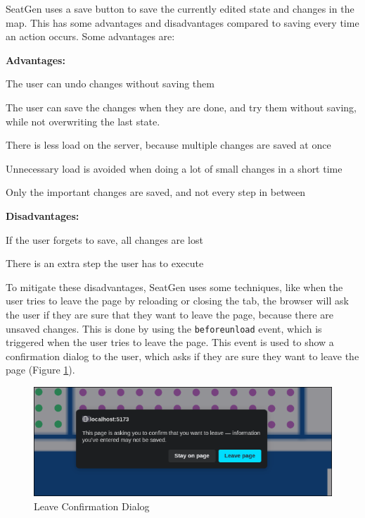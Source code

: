 SeatGen uses a save button to save the currently edited state and changes in the map. This has some advantages and disadvantages compared to saving every time an action occurs. Some advantages are:

\textbf{Advantages:}
\begin{compactitem}
    \item The user can undo changes without saving them
    \item The user can save the changes when they are done, and try them without saving, while not overwriting the last state.
    \item There is less load on the server, because multiple changes are saved at once
    \item Unnecessary load is avoided when doing a lot of small changes in a short time
    \item Only the important changes are saved, and not every step in between
\end{compactitem}

\textbf{Disadvantages:}
\begin{compactitem}
\item If the user forgets to save, all changes are lost
\item There is an extra step the user has to execute
\end{compactitem}

To mitigate these disadvantages, SeatGen uses some techniques, like when the user tries to leave the page by reloading or closing the tab, the browser will ask the user if they are sure that they want to leave the page, because there are unsaved changes. This is done by using the \texttt{beforeunload} event, which is triggered when the user tries to leave the page. This event is used to show a confirmation dialog to the user, which asks if they are sure they want to leave the page (Figure \ref{fig:save-button}).

\begin{figure}
    \centering
    \includegraphics[scale=0.5]{pics/save-button.png}
    \caption{Leave Confirmation Dialog}
    \label{fig:save-button}
\end{figure}


